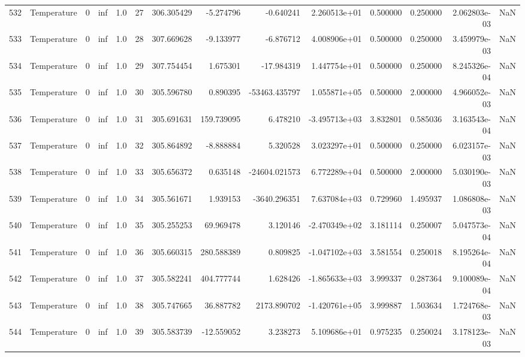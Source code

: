 \begin{tabular}{llrrrrrrrrrrrr}
532 &  Temperature &       0 &  inf &  1.0 &   27 &  306.305429 &    -5.274796 &      -0.640241 &  2.260513e+01 &  0.500000 &  0.250000 &  2.062803e-03 &      NaN \\
533 &  Temperature &       0 &  inf &  1.0 &   28 &  307.669628 &    -9.133977 &      -6.876712 &  4.008906e+01 &  0.500000 &  0.250000 &  3.459979e-03 &      NaN \\
534 &  Temperature &       0 &  inf &  1.0 &   29 &  307.754454 &     1.675301 &     -17.984319 &  1.447754e+01 &  0.500000 &  0.250000 &  8.245326e-04 &      NaN \\
535 &  Temperature &       0 &  inf &  1.0 &   30 &  305.596780 &     0.890395 &  -53463.435797 &  1.055871e+05 &  0.500000 &  2.000000 &  4.966052e-03 &      NaN \\
536 &  Temperature &       0 &  inf &  1.0 &   31 &  305.691631 &   159.739095 &       6.478210 & -3.495713e+03 &  3.832801 &  0.585036 &  3.163543e-04 &      NaN \\
537 &  Temperature &       0 &  inf &  1.0 &   32 &  305.864892 &    -8.888884 &       5.320528 &  3.023297e+01 &  0.500000 &  0.250000 &  6.023157e-03 &      NaN \\
538 &  Temperature &       0 &  inf &  1.0 &   33 &  305.656372 &     0.635148 &  -24604.021573 &  6.772289e+04 &  0.500000 &  2.000000 &  5.030190e-03 &      NaN \\
539 &  Temperature &       0 &  inf &  1.0 &   34 &  305.561671 &     1.939153 &   -3640.296351 &  7.637084e+03 &  0.729960 &  1.495937 &  1.086808e-03 &      NaN \\
540 &  Temperature &       0 &  inf &  1.0 &   35 &  305.255253 &    69.969478 &       3.120146 & -2.470349e+02 &  3.181114 &  0.250007 &  5.047573e-04 &      NaN \\
541 &  Temperature &       0 &  inf &  1.0 &   36 &  305.660315 &   280.588389 &       0.809825 & -1.047102e+03 &  3.581554 &  0.250018 &  8.195264e-04 &      NaN \\
542 &  Temperature &       0 &  inf &  1.0 &   37 &  305.582241 &   404.777744 &       1.628426 & -1.865633e+03 &  3.999337 &  0.287364 &  9.100089e-04 &      NaN \\
543 &  Temperature &       0 &  inf &  1.0 &   38 &  305.747665 &    36.887782 &    2173.890702 & -1.420761e+05 &  3.999887 &  1.503634 &  1.724768e-03 &      NaN \\
544 &  Temperature &       0 &  inf &  1.0 &   39 &  305.583739 &   -12.559052 &       3.238273 &  5.109686e+01 &  0.975235 &  0.250024 &  3.178123e-03 &      NaN \\

\end{tabular}
